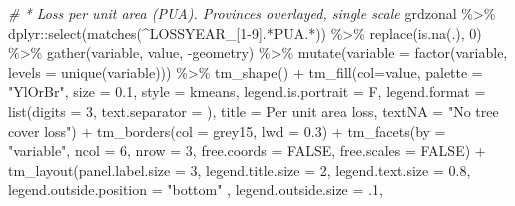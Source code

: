\documentclass[10pt,landscape,a3paper]{article}
\newenvironment{Shaded}{\begin{snugshade}}{\end{snugshade}}
\newcommand{\AttributeTok}[1]{\textcolor[rgb]{0.77,0.63,0.00}{#1}}
\newcommand{\CommentTok}[1]{\textcolor[rgb]{0.56,0.35,0.01}{\textit{#1}}}
\newcommand{\ConstantTok}[1]{\textcolor[rgb]{0.00,0.00,0.00}{#1}}
\newcommand{\DecValTok}[1]{\textcolor[rgb]{0.00,0.00,0.81}{#1}}
\newcommand{\FloatTok}[1]{\textcolor[rgb]{0.00,0.00,0.81}{#1}}
\newcommand{\FunctionTok}[1]{\textcolor[rgb]{0.00,0.00,0.00}{#1}}
\newcommand{\NormalTok}[1]{#1}
\newcommand{\SpecialCharTok}[1]{\textcolor[rgb]{0.00,0.00,0.00}{#1}}
\newcommand{\StringTok}[1]{\textcolor[rgb]{0.31,0.60,0.02}{#1}}
\begin{document}
\begin{Shaded}
\begin{Highlighting}[]
\CommentTok{\# * Loss per unit area (PUA). Provinces overlayed, single scale}
\NormalTok{grdzonal }\SpecialCharTok{\%\textgreater{}\%}\NormalTok{ dplyr}\SpecialCharTok{::}\FunctionTok{select}\NormalTok{(}\FunctionTok{matches}\NormalTok{(}\StringTok{\textquotesingle{}\^{}LOSSYEAR\_[1{-}9].*PUA.*\textquotesingle{}}\NormalTok{)) }\SpecialCharTok{\%\textgreater{}\%}
  \FunctionTok{replace}\NormalTok{(}\FunctionTok{is.na}\NormalTok{(.), }\DecValTok{0}\NormalTok{) }\SpecialCharTok{\%\textgreater{}\%} 
  \FunctionTok{gather}\NormalTok{(variable, value, }\SpecialCharTok{{-}}\NormalTok{geometry) }\SpecialCharTok{\%\textgreater{}\%}
  \FunctionTok{mutate}\NormalTok{(}\AttributeTok{variable =} \FunctionTok{factor}\NormalTok{(variable, }\AttributeTok{levels =} \FunctionTok{unique}\NormalTok{(variable))) }\SpecialCharTok{\%\textgreater{}\%} 
  \FunctionTok{tm\_shape}\NormalTok{() }\SpecialCharTok{+}
  \FunctionTok{tm\_fill}\NormalTok{(}\AttributeTok{col=}\StringTok{\textquotesingle{}value\textquotesingle{}}\NormalTok{, }\AttributeTok{palette =} \StringTok{"YlOrBr"}\NormalTok{, }\AttributeTok{size =} \FloatTok{0.1}\NormalTok{,}
          \AttributeTok{style =} \StringTok{\textquotesingle{}kmeans\textquotesingle{}}\NormalTok{, }\AttributeTok{legend.is.portrait =}\NormalTok{ F, }\AttributeTok{legend.format =} \FunctionTok{list}\NormalTok{(}\AttributeTok{digits =} \DecValTok{3}\NormalTok{, }\AttributeTok{text.separator =} \StringTok{\textquotesingle{}{-}\textquotesingle{}}\NormalTok{),}
          \AttributeTok{title =} \StringTok{\textquotesingle{}Per unit area loss\textquotesingle{}}\NormalTok{, }\AttributeTok{textNA =} \StringTok{"No tree cover loss"}\NormalTok{) }\SpecialCharTok{+}
  \FunctionTok{tm\_borders}\NormalTok{(}\AttributeTok{col =} \StringTok{\textquotesingle{}grey15\textquotesingle{}}\NormalTok{, }\AttributeTok{lwd =} \FloatTok{0.3}\NormalTok{) }\SpecialCharTok{+}
  \FunctionTok{tm\_facets}\NormalTok{(}\AttributeTok{by =} \StringTok{"variable"}\NormalTok{, }\AttributeTok{ncol =} \DecValTok{6}\NormalTok{, }\AttributeTok{nrow =} \DecValTok{3}\NormalTok{, }\AttributeTok{free.coords =} \ConstantTok{FALSE}\NormalTok{, }\AttributeTok{free.scales =} \ConstantTok{FALSE}\NormalTok{) }\SpecialCharTok{+}
  \FunctionTok{tm\_layout}\NormalTok{(}\AttributeTok{panel.label.size =} \DecValTok{3}\NormalTok{, }\AttributeTok{legend.title.size =} \DecValTok{2}\NormalTok{, }\AttributeTok{legend.text.size =} \FloatTok{0.8}\NormalTok{,}
            \AttributeTok{legend.outside.position =} \StringTok{"bottom"}\NormalTok{ , }\AttributeTok{legend.outside.size =}\NormalTok{ .}\DecValTok{1}\NormalTok{,}

\end{Highlighting}
\end{Shaded}
\end{document}
